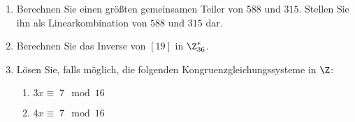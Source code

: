 \documentclass[german]{mhexsheet}
\begin{document}
\begin{exercise}[title = Euklidischer Algorithmus]
 \begin{enumerate}
  \item Berechnen Sie einen größten gemeinsamen Teiler von $588$ und $315$. Stellen Sie ihn als Linearkombination von $588$ und $315$ dar.
  
  \item Berechnen Sie das Inverse von $[19]$ in $\Z_{36}^*$.
  \item Lösen Sie, falls möglich, die folgenden Kongruenzgleichungssysteme in $\Z$:
 \begin{enumerate}[columns = 2]
  \item $3x \equiv \; 7 \mod 16$
  \item $4x \equiv \; 7 \mod 16$
 \end{enumerate}
 \end{enumerate}
\end{exercise}
% 
\end{document}
